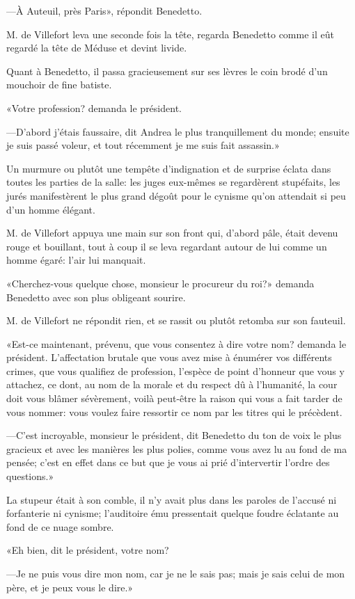 —À Auteuil, près Paris», répondit Benedetto. 

M. de Villefort leva une seconde fois la tête, regarda Benedetto comme il eût regardé la tête de Méduse et devint livide. 

Quant à Benedetto, il passa gracieusement sur ses lèvres le coin brodé d'un mouchoir de fine batiste. 

«Votre profession? demanda le président. 

—D'abord j'étais faussaire, dit Andrea le plus tranquillement du monde; ensuite je suis passé voleur, et tout récemment je me suis fait assassin.» 

Un murmure ou plutôt une tempête d'indignation et de surprise éclata dans toutes les parties de la salle: les juges eux-mêmes se regardèrent stupéfaits, les jurés manifestèrent le plus grand dégoût pour le cynisme qu'on attendait si peu d'un homme élégant. 

M. de Villefort appuya une main sur son front qui, d'abord pâle, était devenu rouge et bouillant, tout à coup il se leva regardant autour de lui comme un homme égaré: l'air lui manquait. 

«Cherchez-vous quelque chose, monsieur le procureur du roi?» demanda Benedetto avec son plus obligeant sourire. 

M. de Villefort ne répondit rien, et se rassit ou plutôt retomba sur son fauteuil. 

«Est-ce maintenant, prévenu, que vous consentez à dire votre nom? demanda le président. L'affectation brutale que vous avez mise à énumérer vos différents crimes, que vous qualifiez de profession, l'espèce de point d'honneur que vous y attachez, ce dont, au nom de la morale et du respect dû à l'humanité, la cour doit vous blâmer sévèrement, voilà peut-être la raison qui vous a fait tarder de vous nommer: vous voulez faire ressortir ce nom par les titres qui le précèdent. 

—C'est incroyable, monsieur le président, dit Benedetto du ton de voix le plus gracieux et avec les manières les plus polies, comme vous avez lu au fond de ma pensée; c'est en effet dans ce but que je vous ai prié d'intervertir l'ordre des questions.» 

La stupeur était à son comble, il n'y avait plus dans les paroles de l'accusé ni forfanterie ni cynisme; l'auditoire ému pressentait quelque foudre éclatante au fond de ce nuage sombre. 

«Eh bien, dit le président, votre nom? 

—Je ne puis vous dire mon nom, car je ne le sais pas; mais je sais celui de mon père, et je peux vous le dire.» 

